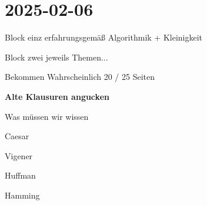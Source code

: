 \section{2025-02-06}

\startframedtipp
\startitemize[packed]
\item Block einz erfahrungsgemäß Algorithmik + Kleinigkeit
\item Block zwei jeweils Themen...
\item Bekommen Wahrscheinlich 20 / 25 Seiten
\item {\bf Alte Klausuren angucken}
\stopitemize
\stopframedtipp


Was müssen wir wissen

\startitemize[packed]
\item Caesar
\item Vigener
\item Huffman
\item Hamming
\stopitemize
